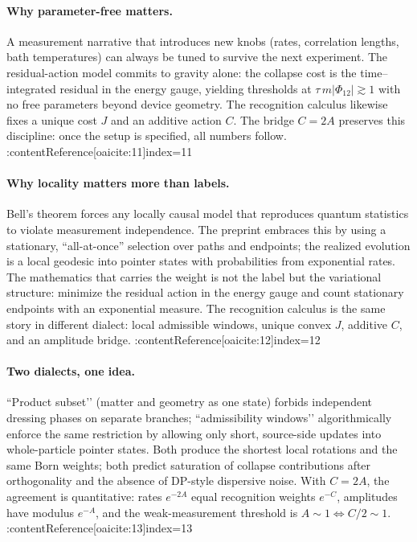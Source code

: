 \documentclass[11pt,letterpaper]{article}
\begin{document}
\paragraph{Why parameter-free matters.}
A measurement narrative that introduces new knobs (rates, correlation lengths, bath temperatures) can always be tuned to survive the next experiment. The residual-action model commits to gravity alone: the collapse cost is the time–integrated residual in the energy gauge, yielding thresholds at \(\tau\,m|\Phi_{12}|\gtrsim 1\) with no free parameters beyond device geometry. The recognition calculus likewise fixes a unique cost \(J\) and an additive action \(C\). The bridge \(C=2A\) preserves this discipline: once the setup is specified, all numbers follow. :contentReference[oaicite:11]{index=11}

\paragraph{Why locality matters more than labels.}
Bell’s theorem forces any locally causal model that reproduces quantum statistics to violate measurement independence. The preprint embraces this by using a stationary, ``all-at-once'' selection over paths and endpoints; the realized evolution is a local geodesic into pointer states with probabilities from exponential rates. The mathematics that carries the weight is not the label but the variational structure: minimize the residual action in the energy gauge and count stationary endpoints with an exponential measure. The recognition calculus is the same story in different dialect: local admissible windows, unique convex \(J\), additive \(C\), and an amplitude bridge. :contentReference[oaicite:12]{index=12}

\paragraph{Two dialects, one idea.}
“Product subset’’ (matter and geometry as one state) forbids independent dressing phases on separate branches; “admissibility windows’’ algorithmically enforce the same restriction by allowing only short, source-side updates into whole-particle pointer states. Both produce the shortest local rotations and the same Born weights; both predict saturation of collapse contributions after orthogonality and the absence of DP-style dispersive noise. With \(C=2A\), the agreement is quantitative: rates \(e^{-2A}\) equal recognition weights \(e^{-C}\), amplitudes have modulus \(e^{-A}\), and the weak-measurement threshold is \(A\sim 1\Leftrightarrow C/2\sim 1\). :contentReference[oaicite:13]{index=13}
\end{document}
